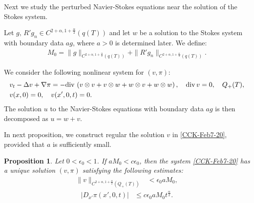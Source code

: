 \documentclass{amsart}
\newtheorem{proposition}[defn]{Proposition}
\numberwithin{equation}{section}
\newcommand{\ep}{{ \epsilon  }}
\newcommand {\al}{\alpha}
\begin{document}
 
 


 Next we study the perturbed Navier-Stokes equations near the solution of the Stokes system.
 

Let $g, \, R' g_n \in C^{2 +\al, 1 +\frac{\al}2}(q(T))$ and let $w$ be a solution to the Stokes system  with boundary data $ag$, where $a >0$ is determined later. 
We define: 
\begin{align*}
M_0 =\| g\|_{ C^{2 +\al, 1 +\frac{\al}2}(q(T)) } + \| R'g_n \|_{ C^{2+\al, 1 +\frac{\al}2}(q(T)) }.
\end{align*}  

We consider the following nonlinear system for $(v, \pi)$:
\begin{align} \label{CCK-Feb7-20}
\begin{split}
&v_t-\Delta v+\nabla \pi =-{\rm div}\,\left(v\otimes v+v\otimes w+w\otimes v+w\otimes w \right),\quad {\rm div} \, v =0, \quad Q_+(T),\\
& v (x,0)=0, \quad v (x', 0,t)=0.
\end{split}
\end{align}
The solution $u$ to the Navier-Stokes equations with boundary data $ag$ is then decomposed as $u = w + v$.

In next proposition, we construct regular the solution $v$  in \eqref{CCK-Feb7-20}, provided that $a$ is sufficiently small. 
\begin{proposition}\label{theorem1118-3}
Let $0 < \ep_0 < 1$. 
If $a M_0< c \ep_0$, then the system \eqref{CCK-Feb7-20} has a unique solution $(v, \pi)$ satisfying the following estimates:
\begin{align}\label{251209-7}
\| v\|_{ C^{2 +\al, 1 +\frac{\al}2} ( Q_+(T)) } & < \ep_0 a M_0,
\end{align}
\begin{align}\label{251208-6}
| D_{x'} \pi (x', 0, t)| & \leq c \ep_0 a M_0 t^{\frac{\al}2}.
\end{align}
\end{proposition}
\end{document}

